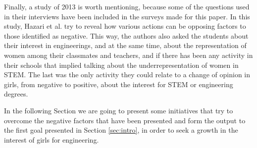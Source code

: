 \documentclass[journal,transmag]{IEEEtran}
\begin{document}
Finally, a study of 2013 \cite{hazari2013factors} is worth mentioning, because some of the questions used in their interviews have been included in the surveys made for this paper. In this study, Hazari et al. try to reveal how various actions can be opposing factors to those identified as negative. This way, the authors also asked the students about their interest in engineerings, and at the same time, about the representation of women among their classmates and teachers, and if there has been any activity in their schools that implied talking about the underrepresentation of women in STEM. The last was the only activity they could relate to a change of opinion in girls, from negative to positive, about the interest for STEM or engineering degrees.

In the following Section we are going to present some initiatives that try to overcome the negative factors that have been presented and form the output to the first goal presented in Section \ref{sec:intro}, in order to seek a growth in the interest of girls for engineering.
\end{document}
